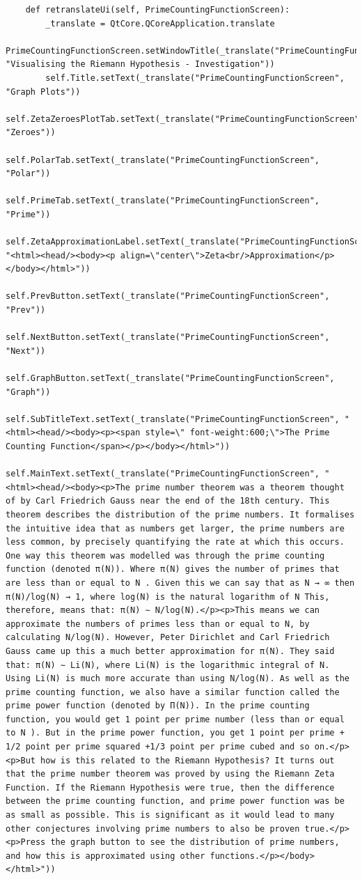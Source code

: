 \documentclass{article}
\begin{document}
\begin{lstlisting}
    def retranslateUi(self, PrimeCountingFunctionScreen):
        _translate = QtCore.QCoreApplication.translate
        PrimeCountingFunctionScreen.setWindowTitle(_translate("PrimeCountingFunctionScreen", "Visualising the Riemann Hypothesis - Investigation"))
        self.Title.setText(_translate("PrimeCountingFunctionScreen", "Graph Plots"))
        self.ZetaZeroesPlotTab.setText(_translate("PrimeCountingFunctionScreen", "Zeroes"))
        self.PolarTab.setText(_translate("PrimeCountingFunctionScreen", "Polar"))
        self.PrimeTab.setText(_translate("PrimeCountingFunctionScreen", "Prime"))
        self.ZetaApproximationLabel.setText(_translate("PrimeCountingFunctionScreen", "<html><head/><body><p align=\"center\">Zeta<br/>Approximation</p></body></html>"))
        self.PrevButton.setText(_translate("PrimeCountingFunctionScreen", "Prev"))
        self.NextButton.setText(_translate("PrimeCountingFunctionScreen", "Next"))
        self.GraphButton.setText(_translate("PrimeCountingFunctionScreen", "Graph"))
        self.SubTitleText.setText(_translate("PrimeCountingFunctionScreen", "<html><head/><body><p><span style=\" font-weight:600;\">The Prime Counting Function</span></p></body></html>"))
        self.MainText.setText(_translate("PrimeCountingFunctionScreen", "<html><head/><body><p>The prime number theorem was a theorem thought of by Carl Friedrich Gauss near the end of the 18th century. This theorem describes the distribution of the prime numbers. It formalises the intuitive idea that as numbers get larger, the prime numbers are less common, by precisely quantifying the rate at which this occurs. One way this theorem was modelled was through the prime counting function (denoted π(N)). Where π(N) gives the number of primes that are less than or equal to N . Given this we can say that as N → ∞ then π(N)/log(N) → 1, where log(N) is the natural logarithm of N This, therefore, means that: π(N) ∼ N/log(N).</p><p>This means we can approximate the numbers of primes less than or equal to N, by calculating N/log(N). However, Peter Dirichlet and Carl Friedrich Gauss came up this a much better approximation for π(N). They said that: π(N) ∼ Li(N), where Li(N) is the logarithmic integral of N. Using Li(N) is much more accurate than using N/log(N). As well as the prime counting function, we also have a similar function called the prime power function (denoted by Π(N)). In the prime counting function, you would get 1 point per prime number (less than or equal to N ). But in the prime power function, you get 1 point per prime + 1/2 point per prime squared +1/3 point per prime cubed and so on.</p><p>But how is this related to the Riemann Hypothesis? It turns out that the prime number theorem was proved by using the Riemann Zeta Function. If the Riemann Hypothesis were true, then the difference between the prime counting function, and prime power function was be as small as possible. This is significant as it would lead to many other conjectures involving prime numbers to also be proven true.</p><p>Press the graph button to see the distribution of prime numbers, and how this is approximated using other functions.</p></body></html>"))
\end{lstlisting}
\end{document}

